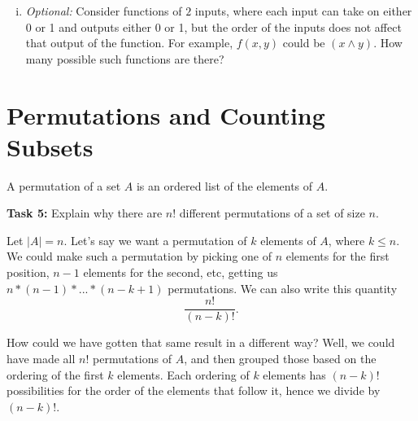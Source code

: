 \documentclass[12pt,letterpaper]{article}
\newif\ifsol
\newcommand{\solu}[2]{ \begin{mdframed} \ifsol #2 \else \vspace{#1} \fi \end{mdframed} }
\begin{document}
\begin{enumerate}[a.]
\begin{enumerate}[i.]
        \textit{Hint:} Two functions are identical if every input leads to the same output.
	    \solu{2 cm}{There are $4^3$ inputs, as described above. There are 2 options for what each can map to, so $2^{(4^3)}$ functions.}

	    \item \textit{Optional: }Consider functions of $2$ inputs, where each input can take on either 0 or 1 and outputs either 0 or 1, but the order of the inputs does not affect that output of the function. For example, $f(x, y)$ could be $(x \land y)$. How many possible such functions are there?
	    \solu{2 cm}{This time, we consider the possible input sequences: $(0, 0), (0, 1), (1, 0), (1, 1)$. Because $f(0, 1)=f(1, 0)$, once we choose where one maps to, we have to choose the same thing for the other, so we effectively only have a choice for 3 inputs, or $2^3$.}
      \end{enumerate}
  \end{enumerate} 
	
	\newpage
	
	\section*{Permutations and Counting Subsets}
	   
	A permutation of a set $A$ is an ordered list of the elements of $A$.
	
	\textbf{Task 5: }Explain why there are $n!$ different permutations of a set of size $n$.
	
	    \solu{1 cm}{$n$ options for the first position, $n-1$ for the second, etc. gives us $n \cdot (n-1)\cdot ...\cdot 1$.}
	
	Let $|A| = n$. Let's say we want a permutation of $k$ elements of $A$, where $k \leq n$. We could make such a permutation by picking one of $n$ elements for the first position, $n-1$ elements for the second, etc, getting us $n*(n-1)*...*(n-k+1)$ permutations. We can also write this quantity  $$\frac{n!}{(n-k)!}.$$
	
	How could we have gotten that same result in a different way? Well, we could have made all $n!$ permutations of $A$, and then grouped those based on the ordering of the first $k$ elements. Each ordering of $k$ elements has $(n-k)!$ possibilities for the order of the elements that follow it, hence we divide by $(n-k)!$.
	
\end{document}
